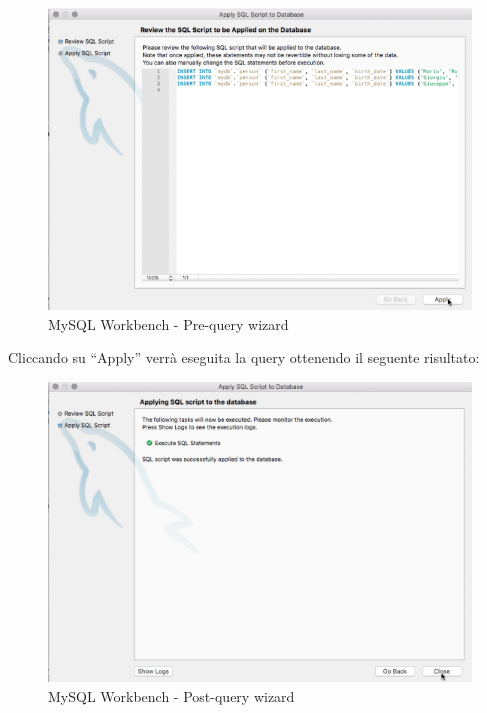 \begin{center}
\begin{figure}[H]
\centering
\includegraphics[scale=0.8]{figures/mySQL_workbench_prequerywizard.png}
\caption{MySQL Workbench - Pre-query wizard}
\end{figure}
\end{center}

Cliccando su “Apply” verrà eseguita la query ottenendo il seguente risultato: 

\begin{center}
\begin{figure}[H]
\centering
\includegraphics[scale=1]{figures/mySQL_workbench_postscriptwizard.png}
\caption{MySQL Workbench - Post-query wizard}
\end{figure}
\end{center}

